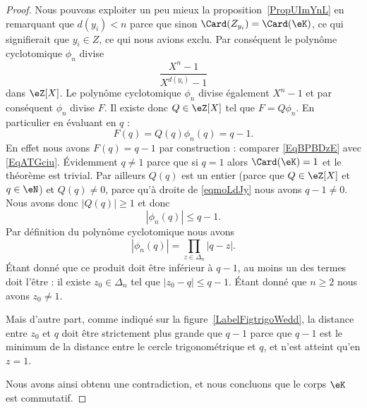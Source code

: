 \begin{proof}
    Nous pouvons exploiter un peu mieux la proposition~\ref{PropUImYnL} en remarquant que \( d(y_i)<n\) parce que sinon \( \Card(Z_{y_i})=\Card(\eK)\), ce qui signifierait que \( y_i\in Z\), ce qui nous avions exclu. Par conséquent le polynôme cyclotomique \( \phi_n\) divise
    \begin{equation}
        \frac{ X^n-1 }{ X^{d(y_i)}-1 }
    \end{equation}
    dans \( \eZ[X]\). Le polynôme cyclotomique \( \phi_n\) divise également \( X^n-1\) et par conséquent \( \phi_n\) divise \( F\). Il existe donc \( Q\in \eZ[X]\) tel que \( F=Q\phi_n\). En particulier en évaluant en \( q\) :
    \begin{equation}    \label{eqmoLdJy}
        F(q)=Q(q)\phi_n(q)=q-1.
    \end{equation}
    En effet nous avons \( F(q)=q-1\) par construction : comparer \eqref{EqBPBDzE} avec \eqref{EqATGciu}. Évidemment \( q\neq 1\) parce que si \( q=1\) alors \( \Card(\eK)=1\) et le théorème est trivial. Par ailleurs \( Q(q)\) est un entier (parce que \( Q\in \eZ[X]\) et \( q\in \eN\)) et \( Q(q)\neq 0\), parce qu'à droite de \eqref{eqmoLdJy} nous avons \( q-1\neq 0\). Nous avons donc \( | Q(q) |\geq 1\) et donc
    \begin{equation}
        | \phi_n(q) |\leq q-1.
    \end{equation}
    Par définition du polynôme cyclotomique nous avons
    \begin{equation}
        | \phi_n(q) |=\prod_{z\in\Delta_n}| q-z |.
    \end{equation}
    Étant donné que ce produit doit être inférieur à \( q-1\), au moins un des termes doit l'être : il existe \( z_0\in \Delta_n\) tel que \( | z_0-q |\leq q-1\). Étant donné que \( n\geq 2\) nous avons \( z_0\neq 1\).

    Mais d'autre part, comme indiqué sur la figure~\ref{LabelFigtrigoWedd}, la distance entre \( z_0\) et \( q\) doit être strictement plus grande que \( q-1\) parce que \( q-1\) est le minimum de la distance entre le cercle trigonométrique et \( q\), et n'est atteint qu'en \( z=1\).
    \newcommand{\CaptionFigtrigoWedd}{Nous devons avoir \( | z_0-q |>q-1\).}
    

    Nous avons ainsi obtenu une contradiction, et nous concluons que le corps \( \eK\) est commutatif.
\end{proof}


